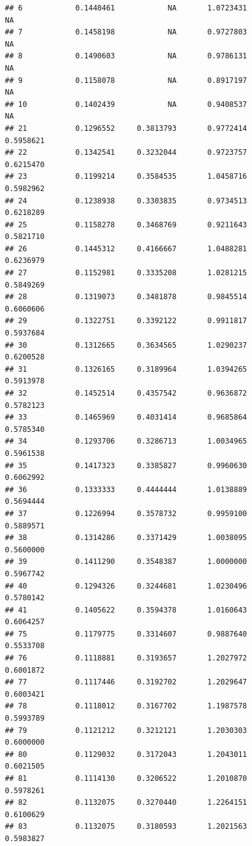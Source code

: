 \documentclass[]{article}
\begin{document}
\begin{verbatim}
## 6            0.1440461            NA       1.0723431                 NA
## 7            0.1458198            NA       0.9727803                 NA
## 8            0.1490603            NA       0.9786131                 NA
## 9            0.1158078            NA       0.8917197                 NA
## 10           0.1402439            NA       0.9408537                 NA
## 21           0.1296552     0.3813793       0.9772414          0.5958621
## 22           0.1342541     0.3232044       0.9723757          0.6215470
## 23           0.1199214     0.3584535       1.0458716          0.5982962
## 24           0.1238938     0.3303835       0.9734513          0.6218289
## 25           0.1158278     0.3468769       0.9211643          0.5821710
## 26           0.1445312     0.4166667       1.0488281          0.6236979
## 27           0.1152981     0.3335208       1.0281215          0.5849269
## 28           0.1319073     0.3481878       0.9845514          0.6060606
## 29           0.1322751     0.3392122       0.9911817          0.5937684
## 30           0.1312665     0.3634565       1.0290237          0.6200528
## 31           0.1326165     0.3189964       1.0394265          0.5913978
## 32           0.1452514     0.4357542       0.9636872          0.5782123
## 33           0.1465969     0.4031414       0.9685864          0.5785340
## 34           0.1293706     0.3286713       1.0034965          0.5961538
## 35           0.1417323     0.3385827       0.9960630          0.6062992
## 36           0.1333333     0.4444444       1.0138889          0.5694444
## 37           0.1226994     0.3578732       0.9959100          0.5889571
## 38           0.1314286     0.3371429       1.0038095          0.5600000
## 39           0.1411290     0.3548387       1.0000000          0.5967742
## 40           0.1294326     0.3244681       1.0230496          0.5780142
## 41           0.1405622     0.3594378       1.0160643          0.6064257
## 75           0.1179775     0.3314607       0.9887640          0.5533708
## 76           0.1118881     0.3193657       1.2027972          0.6001872
## 77           0.1117446     0.3192702       1.2029647          0.6003421
## 78           0.1118012     0.3167702       1.1987578          0.5993789
## 79           0.1121212     0.3212121       1.2030303          0.6000000
## 80           0.1129032     0.3172043       1.2043011          0.6021505
## 81           0.1114130     0.3206522       1.2010870          0.5978261
## 82           0.1132075     0.3270440       1.2264151          0.6100629
## 83           0.1132075     0.3180593       1.2021563          0.5983827

\end{verbatim}
\end{document}
